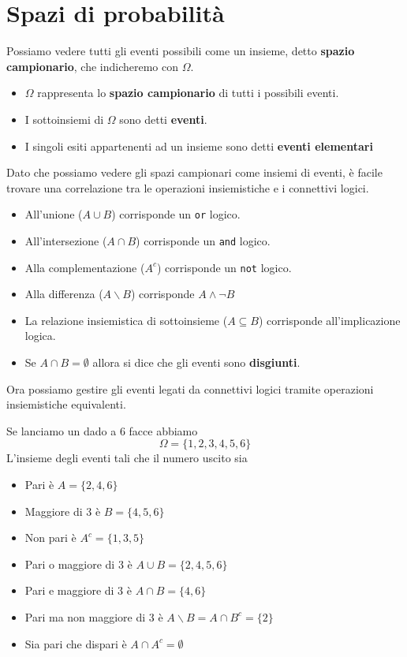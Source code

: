 \section{Spazi di probabilità}
Possiamo vedere tutti gli eventi possibili come un insieme, detto \textbf{spazio campionario}, che
indicheremo con $\Omega$.
\begin{itemize}
	\item $\Omega$ rappresenta lo \textbf{spazio campionario} di tutti i possibili eventi.
	\item I sottoinsiemi di $\Omega$ sono detti \textbf{eventi}.
	\item I singoli esiti appartenenti ad un insieme sono detti \textbf{eventi elementari}
\end{itemize}
Dato che possiamo vedere gli spazi campionari come insiemi di eventi, è facile trovare una 
correlazione tra le operazioni insiemistiche e i connettivi logici.
\begin{itemize}
	\item All'unione ($A \cup B$) corrisponde un \verb|or| logico.
	\item All'intersezione ($A \cap B$) corrisponde un \verb|and| logico.
	\item Alla complementazione ($A^c$) corrisponde un \verb|not| logico.
	\item Alla differenza ($A \backslash B$) corrisponde $A \land \lnot B$
	\item La relazione insiemistica di sottoinsieme ($A \subseteq B$) corrisponde 
		all'implicazione logica.
	\item Se $A \cap B = \emptyset$ allora si dice che gli eventi sono \textbf{disgiunti}.
\end{itemize}
Ora possiamo gestire gli eventi legati da connettivi logici tramite operazioni insiemistiche
equivalenti.

\begin{example}
	Se lanciamo un dado a 6 facce abbiamo
	\[ \Omega = \{ 1, 2, 3, 4, 5, 6 \} \]
	L'insieme degli eventi tali che il numero uscito sia
	\begin{itemize}
		\item Pari è $A = \{ 2, 4, 6 \}$
		\item Maggiore di 3 è $B = \{ 4, 5, 6 \}$
		\item Non pari è $A^c = \{ 1, 3, 5 \}$
		\item Pari o maggiore di 3 è $A \cup B = \{ 2, 4, 5, 6 \}$
		\item Pari e maggiore di 3 è $A \cap B = \{ 4, 6 \}$
		\item Pari ma non maggiore di 3 è $A \backslash B = A \cap B^c = \{2\}$
		\item Sia pari che dispari è $A \cap A^c = \emptyset$
	\end{itemize}
\end{example}

